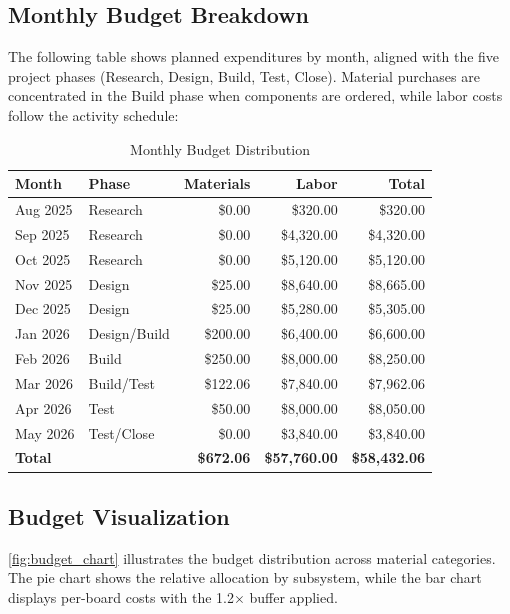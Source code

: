 \subsection{Monthly Budget Breakdown}

The following table shows planned expenditures by month, aligned with the five project phases (Research, Design, Build, Test, Close). Material purchases are concentrated in the Build phase when components are ordered, while labor costs follow the activity schedule:

\begin{table}[H]
\centering
\caption{Monthly Budget Distribution}
\label{tab:monthly_budget}
\begin{tabular}{@{}llrrr@{}}
\toprule
\textbf{Month} & \textbf{Phase} & \textbf{Materials} & \textbf{Labor} & \textbf{Total} \\
\midrule
Aug 2025 & Research & \$0.00 & \$320.00 & \$320.00 \\
Sep 2025 & Research & \$0.00 & \$4,320.00 & \$4,320.00 \\
Oct 2025 & Research & \$0.00 & \$5,120.00 & \$5,120.00 \\
Nov 2025 & Design & \$25.00 & \$8,640.00 & \$8,665.00 \\
Dec 2025 & Design & \$25.00 & \$5,280.00 & \$5,305.00 \\
Jan 2026 & Design/Build & \$200.00 & \$6,400.00 & \$6,600.00 \\
Feb 2026 & Build & \$250.00 & \$8,000.00 & \$8,250.00 \\
Mar 2026 & Build/Test & \$122.06 & \$7,840.00 & \$7,962.06 \\
Apr 2026 & Test & \$50.00 & \$8,000.00 & \$8,050.00 \\
May 2026 & Test/Close & \$0.00 & \$3,840.00 & \$3,840.00 \\
\midrule
\textbf{Total} & & \textbf{\$672.06} & \textbf{\$57,760.00} & \textbf{\$58,432.06} \\
\bottomrule
\end{tabular}
\end{table}

\subsection{Budget Visualization}

\cref{fig:budget_chart} illustrates the budget distribution across material categories. The pie chart shows the relative allocation by subsystem, while the bar chart displays per-board costs with the 1.2$\times$ buffer applied.

